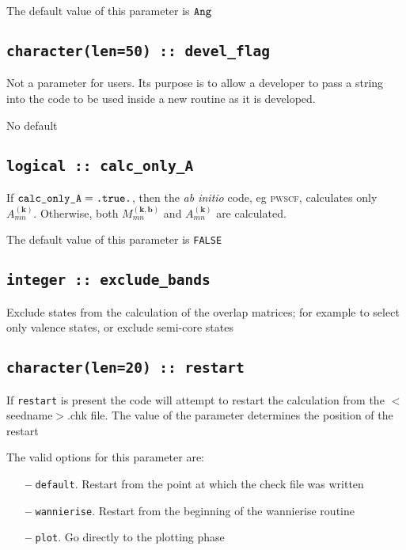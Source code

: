  The default value of this parameter is $\verb#Ang#$

\subsection[devel\_flag]{\tt character(len=50) :: devel\_flag}

Not a parameter for users. Its purpose is to allow a developer to pass a
string into the code to be used inside a new routine as it is developed.

No default

\subsection[calc\_only\_A]{\tt logical :: calc\_only\_A}

If $\verb#calc_only_A#=\verb#.true.#$, then the \textit{ab initio}
code, eg \textsc{pwscf},
calculates only $A_{mn}^{(\mathbf{k})}$. Otherwise, both
$M_{mn}^{(\mathbf{k,b})}$ and $A_{mn}^{(\mathbf{k})}$ are
calculated.

The default value of this parameter is \verb#FALSE#


\subsection[exclude\_bands]{\tt integer :: exclude\_bands}

Exclude states from the calculation of the overlap matrices; for example to select only valence states, or exclude semi-core states

\subsection[restart]{\tt character(len=20) :: restart}

If \verb#restart# is present the code will attempt to restart the calculation
from the $<$seedname$>$.chk file. The value of the parameter
determines the position of the restart

The valid options for this parameter are:
\begin{itemize}
\item[{\bf --}]  \verb#default#. Restart from the point at which the
  check file was written  
\item[{\bf --}]  \verb#wannierise#. Restart from the beginning of the
  wannierise routine 
\item[{\bf --}]  \verb#plot#. Go directly to the plotting phase 


\end{itemize}



